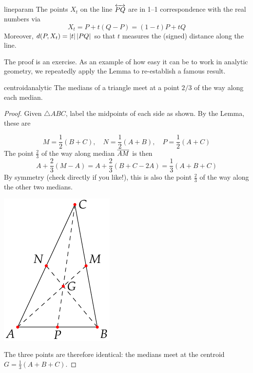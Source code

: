 \goodbreak

\fi


\begin{lemm}{}{lineparam}
	The points $X_t$ on the line $\overleftrightarrow{PQ}$ are in 1--1 correspondence with the real numbers via 
	\[
		X_t= P+t(Q-P)=(1-t)P+tQ
	\]
	Moreover, $d(P,X_t)=\left| t\right|\left| PQ\right|$ so that $t$ measures the (signed) distance along the line.
\end{lemm}

The proof is an exercise. As an example of how easy it can be to work in analytic geometry, 
we repeatedly apply the Lemma to re-establish a famous result.

\begin{thm}{}{centroidanalytic}
	The medians of a triangle meet at a point $2/3$ of the way along each median.
\end{thm}


\begin{proof}
	Given $\triangle ABC$, label the midpoints of each side as shown. By the Lemma, these are\par
	\begin{minipage}[t]{0.7\linewidth}\vspace{-8pt}
		\[M=\frac 12(B+C),\quad N=\frac 12(A+B),\quad P=\frac 12(A+C)\]
		The point $\frac 23$ of the way along median $\overline{AM}$ is then
		\[
			A+\frac 23(M-A)=A+\frac 23(B+C-2A)=\frac 13(A+B+C)
		\]
		By symmetry (check directly if you like!), this is also the point $\frac 23$ of the way along the other two medians.
	\end{minipage}
	\hfill
	\begin{minipage}[t]{0.29\linewidth}\vspace{-15pt}
		\flushright\includegraphics{analytic-centroid}
	\end{minipage}\medbreak
	The three points are therefore identical: the medians meet at the centroid $G=\frac 13(A+B+C)$.
\end{proof}

